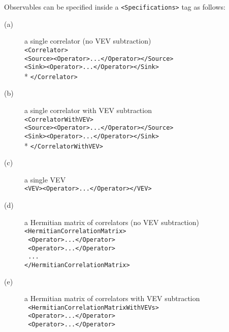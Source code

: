 \documentclass[12pt]{article}
\newcommand{\vb}{\texttt}
\begin{document}
Observables can be specified inside a \vb{<Specifications>} tag as follows:
\begin{description}
\item[(a)]
a single correlator (no VEV subtraction)\\
\texttt{<Correlator>}\\
\hspace*{15pt}\texttt{<Source><Operator>...</Operator></Source>}\\
\hspace*{15pt}\texttt{<Sink><Operator>...</Operator></Sink>}\\                                              *
\texttt{</Correlator>}
\item[(b)]
 a single correlator with VEV subtraction\\
\texttt{<CorrelatorWithVEV>}\\
\hspace*{15pt}\texttt{<Source><Operator>...</Operator></Source>}\\
\hspace*{15pt}\texttt{<Sink><Operator>...</Operator></Sink>}\\                                              *
\texttt{</CorrelatorWithVEV>}
\item[(c)]
 a single VEV\\
\texttt{<VEV><Operator>...</Operator></VEV>}
\item[(d)]
  a Hermitian matrix of correlators (no VEV subtraction)\\
\texttt{<HermitianCorrelationMatrix>}\\
\hspace*{15pt}\texttt{    <Operator>...</Operator>}\\
\hspace*{15pt}\texttt{    <Operator>...</Operator>}\\
\hspace*{25pt}\texttt{   ...              }  \\
\texttt{</HermitianCorrelationMatrix>}
\item[(e)]
 a Hermitian matrix of correlators with VEV subtraction\\
\texttt{       <HermitianCorrelationMatrixWithVEVs>  }\\   
\hspace*{15pt}\texttt{           <Operator>...</Operator>    }\\         
\hspace*{15pt}\texttt{           <Operator>...</Operator> }\\

\end{description}
\end{document}
